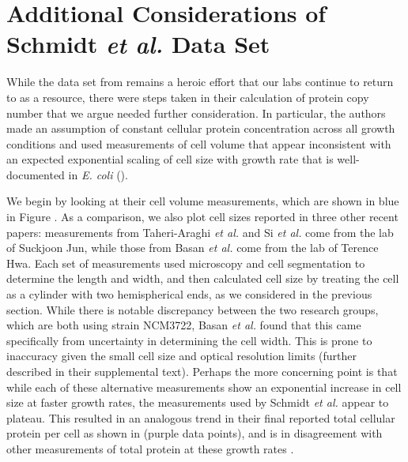 \section{Additional Considerations of Schmidt \textit{et al.} Data Set}
\label{sec:SI_schmidt}
While the data set from \cite{schmidt2016} remains a heroic effort that our
labs continue to return to as a resource, there were steps taken in their
calculation of protein copy number that we argue needed further
consideration. In particular, the authors made an assumption of constant
cellular protein concentration across all growth conditions and used
measurements of cell volume that appear inconsistent with an expected
exponential scaling of cell size with growth rate that is well-documented in
\textit{E. coli} (\cite{schaechter1958, taheriaraghi2015, si2017}).

We begin by looking at their cell volume measurements, which are shown in blue
in Figure . As a comparison, we also plot cell sizes
reported in three other recent papers: measurements from Taheri-Araghi
\textit{et al.} and Si \textit{et al.} come from the lab of Suckjoon Jun, while
those from Basan \textit{et al.} come  from the lab of Terence Hwa.  Each set of
measurements used microscopy and cell segmentation to determine the length and
width, and then calculated cell size by treating the cell as a cylinder with two
hemispherical ends, as we considered in the previous section. While there is
notable discrepancy between the two research groups, which are both using strain
NCM3722, Basan \textit{et al.} found that this came specifically from
uncertainty in determining the cell width. This is prone to inaccuracy given the
small cell size and optical resolution limits (further described in their
supplemental text). Perhaps the more concerning point is that while each of
these alternative measurements show an exponential increase in  cell size at
faster growth rates, the measurements used by Schmidt \textit{et al.} appear to
plateau. This resulted in an analogous trend in their final reported total
cellular protein per cell as shown in 
(purple data points), and is in disagreement with other measurements of total
protein at these growth rates \citep{basan2015}.

